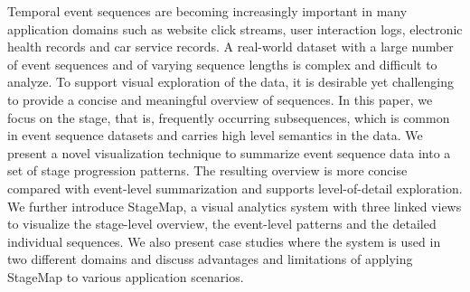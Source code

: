 Temporal event sequences are becoming increasingly important in many application domains such as website click streams, user interaction logs, electronic health records and car service records. A real-world dataset with a large number of event sequences and of varying sequence lengths is complex and difficult to analyze. To support visual exploration of the data, it is desirable yet challenging to provide a concise and meaningful overview of sequences. In this paper, we focus on the stage, that is, frequently occurring subsequences, which is common in event sequence datasets and carries high level semantics in the data. We present a novel visualization technique to summarize event sequence data into a set of stage progression patterns. The resulting overview is more concise compared with event-level summarization and supports level-of-detail exploration. We further introduce StageMap, a visual analytics system with three linked views to visualize the stage-level overview, the event-level patterns and the detailed individual sequences. We also present case studies where the system is used in two different domains and discuss advantages and limitations of applying StageMap to various application scenarios.